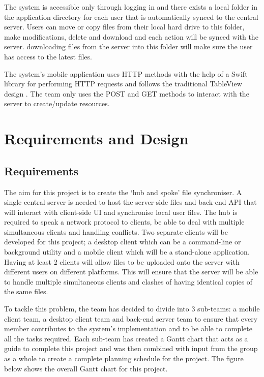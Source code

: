 \documentclass{article}
\begin{document}
The system is accessible only through logging in and there exists a local folder in the application directory for each user that is automatically synced to the central server. Users can move or copy files from their local hard drive to this folder, make modifications, delete and download and each action will be synced with the server. downloading files from the server into this folder will make sure the user has access to the latest files.

The system's mobile application uses HTTP methods with the help of a Swift library \cite{c11} for performing HTTP requests and follows the traditional TableView design \cite{c19}. The team only uses the POST and GET methods to interact with the server to create/update resources.

\section{Requirements and Design}
\subsection{Requirements}
The aim for this project is to create the ‘hub and spoke’ file synchroniser. A single central server is needed to host the server-side files and back-end API that will interact with client-side UI and synchronise local user files. The hub is required to speak a network protocol to clients, be able to deal with multiple simultaneous clients and handling conflicts. Two separate clients will be developed for this project; a desktop client which can be a command-line or background utility and a mobile client which will be a stand-alone application. Having at least 2 clients will allow files to be uploaded onto the server with different users on different platforms. This will ensure that the server will be able to handle multiple simultaneous clients and clashes of having identical copies of the same files.\newline

To tackle this problem, the team has decided to divide into 3 sub-teams: a mobile client team, a desktop client team and back-end server team to ensure that every member contributes to the system’s implementation and to be able to complete all the tasks required. Each sub-team has created a Gantt chart that acts as a guide to complete this project and was then combined with input from the group as a whole to create a complete planning schedule for the project. The figure below shows the overall Gantt chart for this project.
\end{document}
